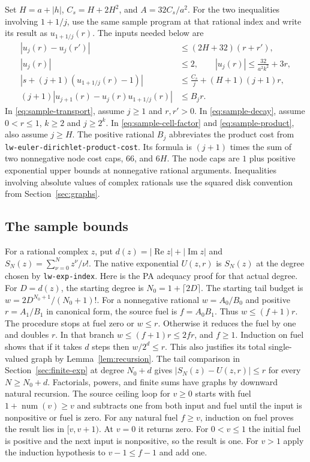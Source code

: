 \documentclass[11pt]{amsart}
\theoremstyle{definition}
\theoremstyle{remark}
\numberwithin{equation}{section}
\newcommand{\re}{\operatorname{Re}}
\newcommand{\im}{\operatorname{Im}}
\newcommand{\code}[1]{\nolinkurl{#1}}
\begin{document}
Set $H=a+|h|$, $C_s=H+2H^2$, and $A=32C_s/a^2$.
For the two inequalities involving $1+1/j$, use the same
sample program at that rational index and write its result as
$u_{1+1/j}(r)$. The inputs needed below are
\begin{align}
 |u_j(r)-u_j(r')|
    &\le (2H+32)(r+r'),
       \label{eq:sample-transport}\\
 |u_j(r)|&\le 2,\qquad
 |u_j(r)|\le \frac{32}{a^2 k^2}+3r,
       \label{eq:sample-decay}\\
 |s+(j+1)(u_{1+1/j}(r)-1)|
    &\le \frac{C_s}{j}+(H+1)(j+1)r,
       \label{eq:sample-cell-factor}\\
 (j+1)|u_{j+1}(r)-u_j(r)u_{1+1/j}(r)|
    &\le B_j r.
       \label{eq:sample-product}
\end{align}
In \eqref{eq:sample-transport}, assume $j\ge1$ and $r,r'>0$.
In \eqref{eq:sample-decay}, assume $0<r\le1$, $k\ge2$
and $j\ge2^k$. In \eqref{eq:sample-cell-factor} and
\eqref{eq:sample-product}, also assume $j\ge H$.
The positive rational $B_j$ abbreviates the product cost from
\code{lw-euler-dirichlet-product-cost}. Its formula is $(j+1)$
times the sum of two nonnegative node cost caps, $66$, and $6H$.
The node caps are $1$ plus positive exponential upper bounds
at nonnegative rational arguments. Inequalities involving absolute
values of complex rationals use the squared disk convention
from Section~\ref{sec:graphs}.

\subsection{The sample bounds}

For a rational complex $z$, put $d(z)=|\re z|+|\im z|$ and
$S_N(z)=\sum_{\nu=0}^N z^\nu/\nu!$. The native exponential
$U(z,r)$ is $S_N(z)$ at the degree chosen by \code{lw-exp-index}.
Here is the PA adequacy proof for that actual degree. For $D=d(z)$,
the starting degree is $N_0=1+\lceil2D\rceil$. The starting tail
budget is $w=2D^{N_0+1}/(N_0+1)!$. For a nonnegative rational
$w=A_0/B_0$ and positive $r=A_1/B_1$ in canonical form,
the source fuel is $f=A_0B_1$. Thus $w\le(f+1)r$.
The procedure stops at fuel zero or $w\le r$. Otherwise it
reduces the fuel by one and doubles $r$. In that branch
$w\le(f+1)r\le2fr$, and $f\ge1$. Induction on fuel shows that
if it takes $d$ steps then $w/2^d\le r$. This also justifies its
total single-valued graph by Lemma~\ref{lem:recursion}.
The tail comparison in Section~\ref{sec:finite-exp} at degree $N_0+d$
gives $|S_N(z)-U(z,r)|\le r$ for every $N\ge N_0+d$.
Factorials, powers, and finite sums have graphs by downward
natural recursion. The source ceiling loop for $v\ge0$ starts
with fuel $1+\operatorname{num}(v)\ge v$ and subtracts one from
both input and fuel until the input is nonpositive or fuel is
zero. For any natural fuel $f\ge v$, induction on fuel proves
the result lies in $[v,v+1)$. At $v=0$ it returns zero.
For $0<v\le1$ the initial fuel is positive and the next input
is nonpositive, so the result is one. For $v>1$ apply the
induction hypothesis to $v-1\le f-1$ and add one.
\end{document}
